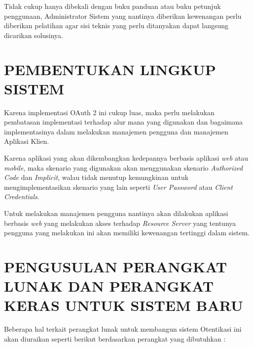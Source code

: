 \documentclass[pdftex,12pt, oneside]{article}
\begin{document}
Tidak cukup hanya dibekali dengan buku panduan atau buku petunjuk penggunaan, Administrator Sistem yang nantinya diberikan kewenangan perlu diberikan pelatihan agar sisi teknis yang perlu ditanyakan dapat langsung dicarikan solusinya.

\section{PEMBENTUKAN LINGKUP SISTEM}

Karena implementasi OAuth 2 ini cukup luas, maka perlu melakukan pembatasan implementasi terhadap alur mana yang digunakan dan bagaimana implementasinya dalam melakukan manajemen pengguna dan manajemen Aplikasi Klien.

Karena aplikasi yang akan dikembangkan kedepannya berbasis aplikasi \textit{web} atau \textit{mobile}, maka skenario yang digunakan akan menggunakan skenario \textit{Authorized Code} dan \textit{Implicit}, walau tidak menutup kemungkinan untuk mengimplementasikan skenario yang lain seperti \textit{User Password} atau \textit{Client Credentials}.

Untuk melakukan manajemen pengguna nantinya akan dilakukan aplikasi berbasis \textit{web} yang melakukan akses terhadap \textit{Resource Server} yang tentunya pengguna yang melakukan ini akan memiliki kewenangan tertinggi dalam sistem.

\section{PENGUSULAN PERANGKAT LUNAK DAN PERANGKAT KERAS UNTUK SISTEM BARU}

Beberapa hal terkait perangkat lunak untuk membangun sistem Otentikasi ini akan diuraikan seperti berikut berdasarkan perangkat yang dibutuhkan :
\end{document}

